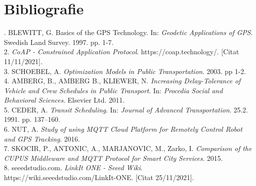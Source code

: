 \chapter*{Bibliografie}
. BLEWITT, G. Basics of the GPS Technology. In: \textit{Geodetic Applications of GPS}. Swedish Land Survey. 1997. pp. 1-7. \\
2. \textit{CoAP - Constrained Application Protocol}. https://coap.technology/. [Citat 11/11/2021]. \\
3. SCHOEBEL, A. \textit{Optimization Models in Public Transportation}. 2003. pp 1-2. \\
4. AMBERG, B., AMBERG B., KLIEWER, N. \textit{Increasing Delay-Tolerance of Vehicle and Crew Schedules in Public Transport}. In: \textit{Procedia Social and Behavioral Sciences}. Elsevier Ltd. 2011. \\
5. CEDER, A. \textit{Transit Scheduling}. In: \textit{Journal of Advanced Transportation}. 25.2. 1991. pp. 137–160. \\
6. NUT, A. \textit{Study of using MQTT Cloud Platform for Remotely Control Robot and GPS Tracking}. 2016. \\
7. SKOCIR, P., ANTONIC, A., MARJANOVIC, M., Zarko, I. \textit{Comparison of the
CUPUS Middleware and MQTT Protocol for Smart City Services}. 2015. \\
8. seeedstudio.com. \textit{LinkIt ONE - Seeed Wiki}. https://wiki.seeedstudio.com/LinkIt-ONE. [Citat 25/11/2021]. \\
